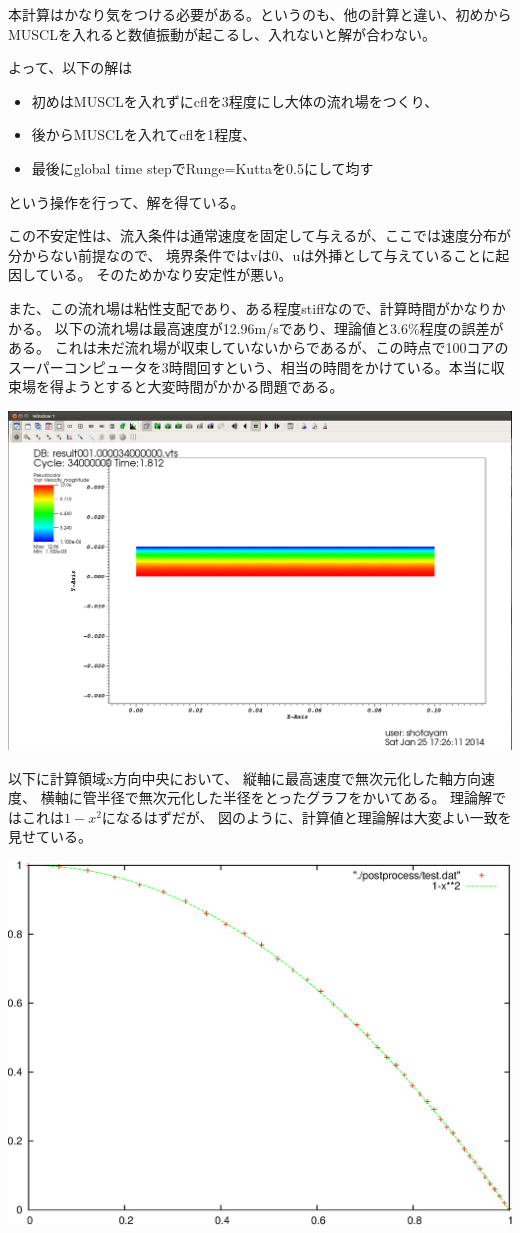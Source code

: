 \documentclass{jsarticle}
\begin{document}
本計算はかなり気をつける必要がある。というのも、他の計算と違い、初めからMUSCLを入れると数値振動が起こるし、入れないと解が合わない。

よって、以下の解は
\begin{itemize}
\item 初めはMUSCLを入れずにcflを3程度にし大体の流れ場をつくり、
\item 後からMUSCLを入れてcflを1程度、
\item 最後にglobal time stepでRunge=Kuttaを0.5にして均す
\end{itemize}
という操作を行って、解を得ている。

この不安定性は、流入条件は通常速度を固定して与えるが、ここでは速度分布が分からない前提なので、
境界条件ではvは0、uは外挿として与えていることに起因している。
そのためかなり安定性が悪い。

また、この流れ場は粘性支配であり、ある程度stiffなので、計算時間がかなりかかる。
以下の流れ場は最高速度が12.96m/sであり、理論値と3.6\%程度の誤差がある。
これは未だ流れ場が収束していないからであるが、この時点で100コアのスーパーコンピュータを3時間回すという、相当の時間をかけている。本当に収束場を得ようとすると大変時間がかかる問題である。
\begin{center}
\includegraphics[width=.8\textwidth,bb=0 0 1569 1057]{sample/no11.png}
\end{center}
以下に計算領域x方向中央において、
縦軸に最高速度で無次元化した軸方向速度、
横軸に管半径で無次元化した半径をとったグラフをかいてある。
理論解ではこれは$1-x^2$になるはずだが、
図のように、計算値と理論解は大変よい一致を見せている。
\begin{center}
\includegraphics[width=.5\textwidth]{sample/no11.1.eps}
\end{center}
\end{document}
